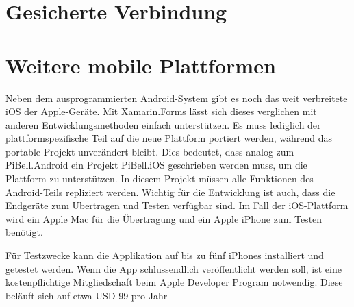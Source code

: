 \wip
\section{Gesicherte Verbindung}%
\section{Weitere mobile Plattformen}
Neben dem ausprogrammierten Android-System gibt es noch das weit verbreitete iOS der Apple-Geräte.
Mit Xamarin.Forms lässt sich dieses verglichen mit anderen Entwicklungsmethoden einfach unterstützen.
Es muss lediglich der plattformspezifische Teil auf die neue Plattform portiert werden, während das portable Projekt unverändert bleibt.
Dies bedeutet, dass analog zum PiBell.Android ein Projekt PiBell.iOS geschrieben werden muss, um die Plattform zu unterstützen.
In diesem Projekt müssen alle Funktionen des Android-Teils repliziert werden.
Wichtig für die Entwicklung ist auch, dass die Endgeräte zum Übertragen und Testen verfügbar sind.
Im Fall der iOS-Plattform wird ein Apple Mac für die Übertragung und ein Apple iPhone zum Testen benötigt.\par

Für Testzwecke kann die Applikation auf bis zu fünf iPhones installiert und getestet werden.
Wenn die App schlussendlich veröffentlicht werden soll, ist eine kostenpflichtige Mitgliedschaft beim Apple Developer Program notwendig.
Diese beläuft sich auf etwa USD 99 pro Jahr \cite[vgl.][Integrated Development Environment (IDE) Availability]{msdoc-xamarin-fundamentals}
